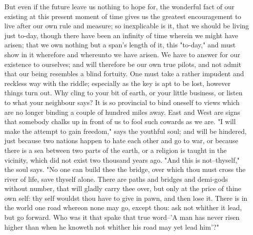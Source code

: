 But even if the future leave us nothing to hope for, the wonderful
fact of our existing at this present moment of time gives us the
greatest encouragement to live after our own rule and measure; so
inexplicable is it, that we should be living just to-day, though
there have been an infinity of time wherein we might have arisen;
that we own nothing but a span's length of it, this "to-day," and
must show in it wherefore and whereunto we have arisen. We have to
answer for our existence to ourselves; and will therefore be our own
true pilots, and not admit that our being resembles a blind fortuity.
One must take a rather impudent and reckless way with the riddle;
especially as the key is apt to be lost, however things turn out. Why
cling to your bit of earth, or your little business, or listen to
what your neighbour says? It is so provincial to bind oneself to
views which are no longer binding a couple of hundred miles away.
East and West are signs that somebody chalks up in front of us to
fool such cowards as we are. "I will make the attempt to gain
freedom," says the youthful soul; and will be hindered, just because
two nations happen to hate each other and go to war, or because there
is a sea between two parts of the earth, or a religion is taught in
the vicinity, which did not exist two thousand years ago. "And this
is not--thyself," the soul says. "No one can build thee the bridge,
over which thou must cross the river of life, save thyself alone.
There are paths and bridges and demi-gods without number, that will
gladly carry thee over, but only at the price of thine own self: thy
self wouldst thou have to give in pawn, and then lose it. There is in
the world one road whereon none may go, except thou: ask not whither
it lead, but go forward. Who was it that spake that true word--'A man
has never risen higher than when he knoweth not whither his road may
yet lead him'?"

